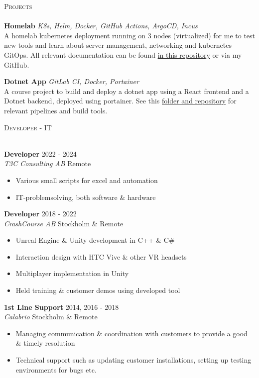 \documentclass[a4paper]{article}
\newcommand{\lineunder} {
    \vspace*{-8pt} \\
    \hspace*{-18pt} \hrulefill \\
}
\newcommand{\header} [1] {
    {\hspace*{-18pt}\vspace*{6pt} \textsc{#1}}
    \vspace*{-6pt} \lineunder
}
\begin{document}
\header{Projects}
{\textbf{Homelab}} {\sl K8s, Helm, Docker, GitHub Actions, ArgoCD, Incus} \\
A homelab kubernetes deployment running on 3 nodes (virtualized) for me to test new tools and learn about server management, networking and kubernetes GitOps. All relevant documentation can be found \href{https://github.com/pontusc/homelab}{in this repository} or via my GitHub.\\
\vspace{4mm}

{\textbf{Dotnet App}} {\sl GitLab CI, Docker, Portainer} \\
A course project to build and deploy a dotnet app using a React frontend and a Dotnet backend, deployed using portainer. See this \href{https://github.com/pontusc/devops-doe24/tree/main/pipeline-utilities}{folder and repository} for relevant pipelines and build tools.\\
\vspace{8mm}

\header{Developer - IT}
\vspace{4mm}

\textbf{Developer} \hfill 2022 - 2024\\
\textit{T3C Consulting AB} \hfill Remote\\
\vspace{-1mm}
\begin{itemize} \itemsep 1pt
  \item Various small scripts for excel and automation
  \item IT-problemsolving, both software \& hardware
\end{itemize}
\vspace{1mm}
\textbf{Developer} \hfill 2018 - 2022\\
\textit{CrashCourse AB} \hfill Stockholm \& Remote\\
\vspace{-1mm}
\begin{itemize} \itemsep 1pt
  \item Unreal Engine \& Unity development in C++ \& C\#
  \item Interaction design with HTC Vive \& other VR headsets
  \item Multiplayer implementation in Unity
  \item Held training \& customer demos using developed tool
\end{itemize}
\vspace{1mm}
\textbf{1st Line Support} \hfill 2014, 2016 - 2018\\
\textit{Calabrio} \hfill Stockholm \& Remote\\
\vspace{-1mm}
\begin{itemize} \itemsep 1pt
  \item Managing communication \& coordination with customers to provide a good \& timely resolution
  \item Technical support such as updating customer installations, setting up testing environments for bugs etc.
\end{itemize}
\vspace{8mm}
\ 
\end{document}
